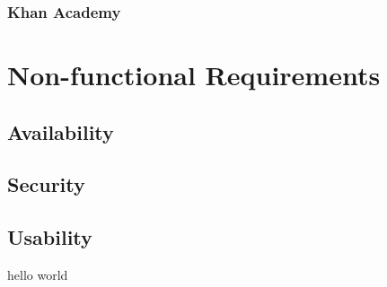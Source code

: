 \subsubsection{Khan Academy}

\section{Non-functional Requirements}

\subsection{Availability}

\subsection{Security}

\subsection{Usability}

hello world
